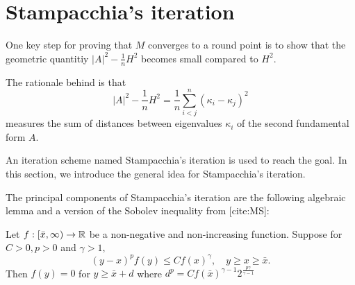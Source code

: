 \section{Stampacchia's iteration}
One key step for proving that $M$ converges to a round point is to show that the geometric quantitiy $\left| A \right| ^2-\frac{1}{n}H^2$ becomes small compared to $H^2$.

The rationale behind is that
\[\left| A \right| ^2-\frac{1}{n}H^2=\frac{1}{n}\sum_{i<j}^{n}(\kappa _i-\kappa _j)^2\]
measures the sum of distances between eigenvalues $\kappa _i$ of the second fundamental form $A$. 

An iteration scheme named Stampacchia's iteration is used to reach the goal. In this section, we introduce the general idea for Stampacchia's iteration.

The principal components of Stampacchia's iteration are the following algebraic lemma and a version of the Sobolev inequality from [cite:MS]:
\begin{lemma} \label{SIalg}
	Let $f : [\bar{x},\infty) \to \mathbb{R}$ be a non-negative and non-increasing function. Suppose for $C>0, p>0$ and $\gamma >1,$ 
	\[ (y-x)^{p}f(y) \leq Cf(x)^{\gamma }, \quad y \geq x \geq \bar{x}.\] 
	Then $f(y)=0$ for $y \geq \bar{x} + d$ where $d^p=C f(\bar{x})^{\gamma -1}2^{\frac{p \gamma }{\gamma -1}}$ 
\end{lemma}
